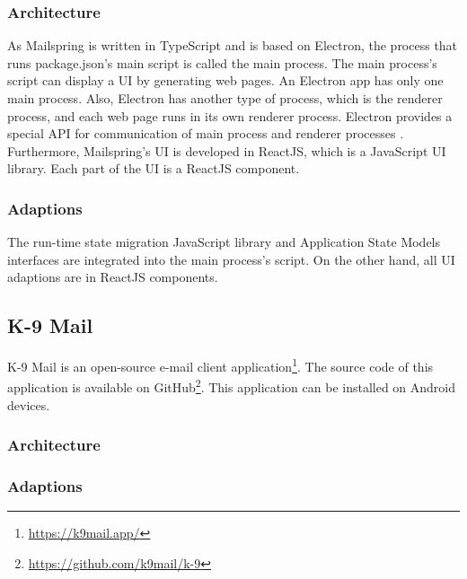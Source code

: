 \subsubsection{Architecture}
As Mailspring is written in TypeScript and is based on Electron, the process that runs package.json's main script is called the main process. The main process's script can display a UI by generating web pages. An Electron app has only one main process. Also, Electron has another type of process, which is the renderer process, and each web page runs in its own renderer process. Electron provides a special API for communication of main process and renderer processes \cite{electron}. Furthermore, Mailspring's UI is developed in ReactJS, which is a JavaScript UI library. Each part of the UI is a ReactJS component.

\subsubsection{Adaptions}
The run-time state migration JavaScript library and Application State Models interfaces are integrated into the main process's script. On the other hand, all UI adaptions are in ReactJS components. 


\subsection{K-9 Mail}
K-9 Mail is an open-source e-mail client application\footnote{\url{https://k9mail.app/}}. The source code of this application is available on GitHub\footnote{\url{https://github.com/k9mail/k-9}}. This application can be installed on Android devices.

\subsubsection{Architecture}

\subsubsection{Adaptions}

